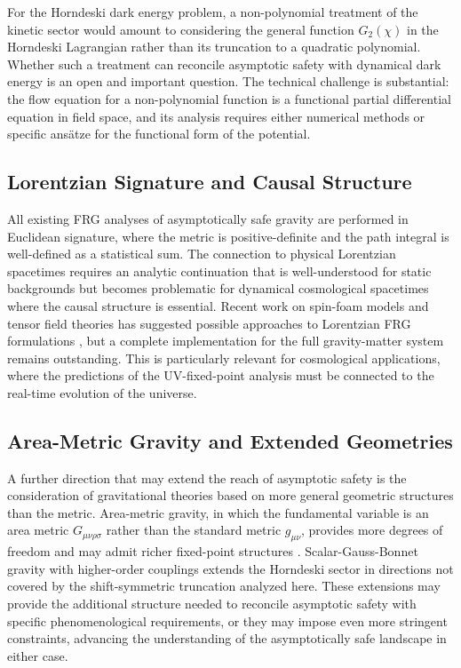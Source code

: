 \documentclass[12pt,a4paper]{article}
\begin{document}
For the Horndeski dark energy problem, a non-polynomial treatment of the
kinetic sector would amount to considering the general function $G_2(\chi)$
in the Horndeski Lagrangian rather than its truncation to a quadratic polynomial.
Whether such a treatment can reconcile asymptotic safety with dynamical dark
energy is an open and important question. The technical challenge is substantial:
the flow equation for a non-polynomial function is a functional partial
differential equation in field space, and its analysis requires either
numerical methods or specific ans\"atze for the functional form of the
potential.

\subsection{Lorentzian Signature and Causal Structure}

All existing FRG analyses of asymptotically safe gravity are performed in
Euclidean signature, where the metric is positive-definite and the path
integral is well-defined as a statistical sum. The connection to physical
Lorentzian spacetimes requires an analytic continuation that is well-understood
for static backgrounds but becomes problematic for dynamical cosmological
spacetimes where the causal structure is essential. Recent work on spin-foam
models and tensor field theories has suggested possible approaches to Lorentzian
FRG formulations \cite{EichhornGurauGyftopoulos2025,CastroEichhornGurau2026},
but a complete implementation for the full gravity-matter system remains
outstanding. This is particularly relevant for cosmological applications, where
the predictions of the UV-fixed-point analysis must be connected to the
real-time evolution of the universe.

\subsection{Area-Metric Gravity and Extended Geometries}

A further direction that may extend the reach of asymptotic safety is the
consideration of gravitational theories based on more general geometric
structures than the metric. Area-metric gravity, in which the fundamental
variable is an area metric $G_{\mu\nu\rho\sigma}$ rather than the standard
metric $g_{\mu\nu}$, provides more degrees of freedom and may admit richer
fixed-point structures \cite{BorissovaDittrichEichhornSchiffer2025}.
Scalar-Gauss-Bonnet gravity with higher-order couplings \cite{EichhornFernandes2026}
extends the Horndeski sector in directions not covered by the shift-symmetric
truncation analyzed here. These extensions may provide the additional structure
needed to reconcile asymptotic safety with specific phenomenological requirements,
or they may impose even more stringent constraints, advancing the understanding
of the asymptotically safe landscape in either case.
\end{document}
